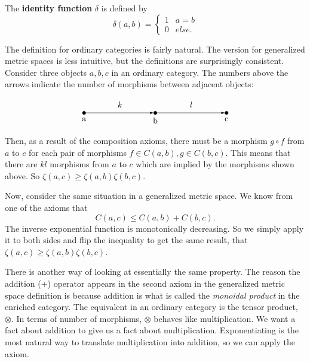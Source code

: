 \documentclass[12pt]{pom_thesis}
\begin{document}
The \textbf{identity function} $\delta$ is defined by 
\[\delta(a,b) = \begin{cases} 1 & a = b \\ 0 & else. \end{cases}
\]


The definition for ordinary categories is fairly natural. The version for generalized metric spaces is less intuitive, but the definitions are surprisingly consistent. Consider three objects $a,b,c$ in an ordinary category. The numbers above the arrows indicate the number of morphisms between adjacent objects:

\[
\begin{tikzpicture}[auto, node distance = 3cm, main node/.style={dot}]

\node[label = below:{a}, circle, draw, fill=black,
                        inner sep=0pt, minimum width=4pt](1) at (0,0) {};
\node[label = below:{b}, circle, draw, fill=black,
                        inner sep=0pt, minimum width=4pt](2) at (3,0) {};
\node[label = below:{c}, circle, draw, fill=black,
                        inner sep=0pt, minimum width=4pt](3) at (6,0) {};                        

\draw[-latex] (1) -- (2) node[midway, above = 3pt] {\textit{k}};
\draw[-latex] (2) -- (3) node[midway, above = 3pt] {\textit{l}};

\end{tikzpicture}\]
Then, as a result of the composition axioms, there must be a morphism $g \circ f$ from $a$ to $c$ for each pair of morphisms $f \in C(a,b), g \in C(b,c)$. This means that there are $kl$ morphisms from $a$ to $c$ which are implied by the morphisms shown above. So $\zeta(a,c) \geq \zeta(a,b)  \zeta(b,c)$. 

Now, consider the same situation in a generalized metric space. We know from one of the axioms that
\[
C(a,c) \leq C(a,b) + C(b,c).
\]
The inverse exponential function is monotonically decreasing. So we simply apply it to both sides and flip the inequality to get the same result, that $\zeta(a,c) \geq \zeta(a,b) \zeta(b,c)$.

There is another way of looking at essentially the same property. The reason the addition (+) operator appears in the second axiom in the generalized metric space definition is because addition is what is called the \textit{monoidal product} in the enriched category. The equivalent in an ordinary category is the tensor product, $\otimes$. In terms of number of morphisms, $\otimes$ behaves like multiplication. We want a fact about addition to give us a fact about multiplication. Exponentiating is the most natural way to translate multiplication into addition, so we can apply the axiom.
\fi
\end{document}
